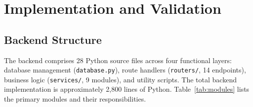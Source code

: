 \documentclass[11pt, a4paper]{report}
\begin{document}
\chapter{Implementation and Validation}

\section{Backend Structure}

The backend comprises 28 Python source files across four functional layers: database management (\texttt{database.py}), route handlers (\texttt{routers/}, 14 endpoints), business logic (\texttt{services/}, 9 modules), and utility scripts. The total backend implementation is approximately 2,800 lines of Python. Table~\ref{tab:modules} lists the primary modules and their responsibilities.
\end{document}
